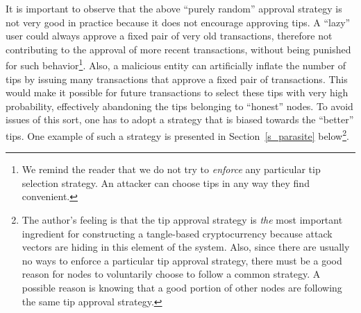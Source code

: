 \documentclass[12pt]{article}
\begin{document}
\begin{CJK}{UTF8}{bkai}
It is important to observe
 that 
the above ``purely random'' approval 
strategy is not very good in practice 
because it does not encourage approving tips.
A ``lazy'' user could 
always approve a fixed 
pair
of very old transactions, therefore not contributing to the approval of 
more recent transactions,
without being punished for such behavior\footnote{We 
remind the reader that we do not try to \emph{enforce}
any particular tip selection strategy. An 
attacker can choose tips in any way they find convenient.}.
Also, a malicious entity can artificially inflate the number
of tips 
by issuing many transactions that approve
a fixed pair of transactions. 
This would make it possible for future transactions to
select these tips with very high probability, effectively
 abandoning the tips belonging to ``honest'' nodes.
To avoid issues of this sort, one has to adopt a
strategy that is biased towards the ``better'' tips.
One example of such a strategy is presented in Section~\ref{s_parasite}
below\footnote{The author's feeling is that the tip approval 
strategy is \emph{the} most important ingredient for 
constructing a tangle-based cryptocurrency because 
attack vectors are hiding in this element of the system.
 Also, since there are usually no ways to 
enforce a particular tip approval strategy, there must be a 
good reason for nodes to voluntarily choose to follow a common 
strategy. A possible reason is knowing that a good portion of other 
nodes are following the same tip approval strategy. 
}.



\end{CJK}
\end{document}
